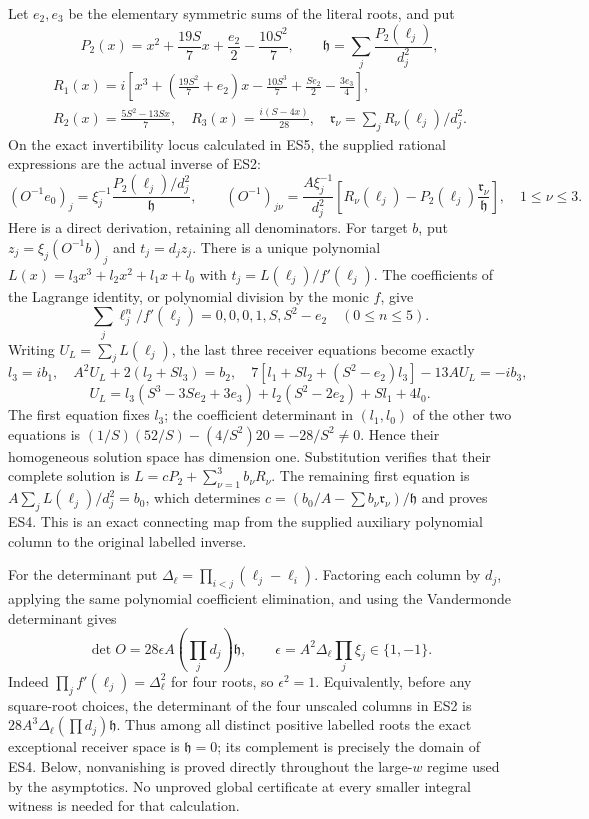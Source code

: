 \documentclass[11pt]{article}
\begin{document}
Let \(e_2,e_3\) be the elementary symmetric sums of the literal roots, and put \[
P_2(x)=x^2+\frac{19S}{7}x+\frac{e_2}{2}-\frac{10S^2}{7},\qquad
\mathfrak h=\sum_j\frac{P_2(\ell_j)}{d_j^2},
\] \[
\begin{gathered}
R_1(x)=i\left[x^3+\left(\frac{19S^2}{7}+e_2\right)x-\frac{10S^3}{7}+\frac{Se_2}{2}-\frac{3e_3}{4}\right],\\
R_2(x)=\frac{5S^2-13Sx}{7},\quad R_3(x)=\frac{i(S-4x)}{28},\quad
\mathfrak r_\nu=\sum_jR_\nu(\ell_j)/d_j^2.
\end{gathered}
\tag{ES3}
\] On the exact invertibility locus calculated in ES5, the supplied rational expressions are the actual inverse of ES2: \[
(O^{-1}e_0)_j=\xi_j^{-1}\frac{P_2(\ell_j)/d_j^2}{\mathfrak h},
\qquad
(O^{-1})_{j\nu}=\frac{A\xi_j^{-1}}{d_j^2}
\left[R_\nu(\ell_j)-P_2(\ell_j)\frac{\mathfrak r_\nu}{\mathfrak h}\right],\quad1\le\nu\le3.
\tag{ES4}
\] Here is a direct derivation, retaining all denominators. For target \(b\), put \(z_j=\xi_j(O^{-1}b)_j\) and \(t_j=d_jz_j\). There is a unique polynomial \(L(x)=l_3x^3+l_2x^2+l_1x+l_0\) with \(t_j=L(\ell_j)/f'(\ell_j)\). The coefficients of the Lagrange identity, or polynomial division by the monic \(f\), give \[
\sum_j\ell_j^n/f'(\ell_j)=0,0,0,1,S,S^2-e_2\quad(0\le n\le5).
\] Writing \(U_L=\sum_jL(\ell_j)\), the last three receiver equations become exactly \[
l_3=ib_1,\quad A^2U_L+2(l_2+Sl_3)=b_2,
\quad7[l_1+Sl_2+(S^2-e_2)l_3]-13AU_L=-ib_3,
\] \[
U_L=l_3(S^3-3Se_2+3e_3)+l_2(S^2-2e_2)+Sl_1+4l_0.
\] The first equation fixes \(l_3\); the coefficient determinant in \((l_1,l_0)\) of the other two equations is \((1/S)(52/S)-(4/S^2)20=-28/S^2\ne0\). Hence their homogeneous solution space has dimension one. Substitution verifies that their complete solution is \(L=cP_2+\sum_{\nu=1}^3b_\nu R_\nu\). The remaining first equation is \(A\sum_jL(\ell_j)/d_j^2=b_0\), which determines \(c=(b_0/A-\sum b_\nu\mathfrak r_\nu)/\mathfrak h\) and proves ES4. This is an exact connecting map from the supplied auxiliary polynomial column to the original labelled inverse.

For the determinant put \(\Delta_\ell=\prod_{i<j}(\ell_j-\ell_i)\). Factoring each column by \(d_j\), applying the same polynomial coefficient elimination, and using the Vandermonde determinant gives \[
\det O=28\epsilon A\left(\prod_jd_j\right)\mathfrak h,
\qquad \epsilon=A^2\Delta_\ell\prod_j\xi_j\in\{1,-1\}.
\tag{ES5}
\] Indeed \(\prod_jf'(\ell_j)=\Delta_\ell^2\) for four roots, so \(\epsilon^2=1\). Equivalently, before any square-root choices, the determinant of the four unscaled columns in ES2 is \(28A^3\Delta_\ell(\prod d_j)\mathfrak h\). Thus among all distinct positive labelled roots the exact exceptional receiver space is \(\mathfrak h=0\); its complement is precisely the domain of ES4. Below, nonvanishing is proved directly throughout the large-\(w\) regime used by the asymptotics. No unproved global certificate at every smaller integral witness is needed for that calculation.
\end{document}
